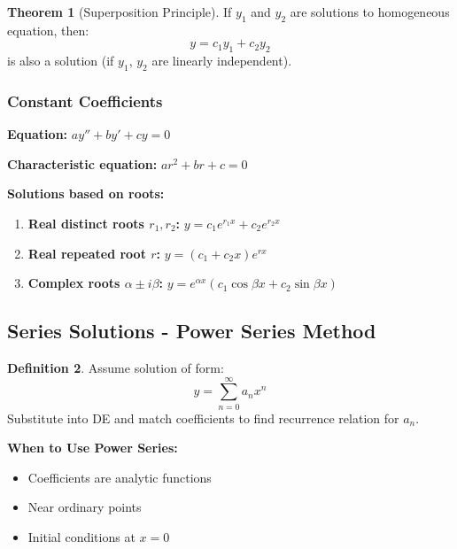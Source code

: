 \documentclass[12pt,a4paper]{article}
\theoremstyle{definition}
\newtheorem{theorem}{Theorem}[section]
\newtheorem{definition}[theorem]{Definition}
\begin{document}
\begin{theorem}[Superposition Principle]
If $y_1$ and $y_2$ are solutions to homogeneous equation, then:
\[
y = c_1y_1 + c_2y_2
\]
is also a solution (if $y_1$, $y_2$ are linearly independent).
\end{theorem}

\subsubsection{Constant Coefficients}

\begin{importantbox}
\textbf{Equation:} $ay'' + by' + cy = 0$

\textbf{Characteristic equation:} $ar^2 + br + c = 0$

\textbf{Solutions based on roots:}
\begin{enumerate}
    \item \textbf{Real distinct roots $r_1, r_2$:} $y = c_1e^{r_1x} + c_2e^{r_2x}$
    
    \item \textbf{Real repeated root $r$:} $y = (c_1 + c_2x)e^{rx}$
    
    \item \textbf{Complex roots $\alpha \pm i\beta$:} $y = e^{\alpha x}(c_1\cos\beta x + c_2\sin\beta x)$
\end{enumerate}
\end{importantbox}

\subsection{Series Solutions - Power Series Method}

\begin{definition}
Assume solution of form:
\[
y = \sum_{n=0}^{\infty} a_n x^n
\]
Substitute into DE and match coefficients to find recurrence relation for $a_n$.
\end{definition}

\begin{tipbox}
\textbf{When to Use Power Series:}
\begin{itemize}
    \item Coefficients are analytic functions
    \item Near ordinary points
    \item Initial conditions at $x = 0$
\end{itemize}
\end{tipbox}
\end{document}
